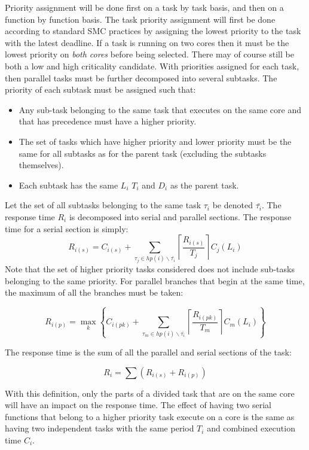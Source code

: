 \documentclass[table,11pt]{article}
\begin{document}
Priority assignment will be done first on a task by task basis, and then on a function by function basis. The task priority assignment will first be done according to standard SMC practices by assigning the lowest priority to the task with the latest deadline. If a task is running on two cores then it must be the lowest priority on \emph{both cores} before being selected. There may of course still be both a low and high criticality candidate. With priorities assigned for each task, then parallel tasks must be further decomposed into several subtasks. The priority of each subtask must be assigned such that:
\begin{itemize}
 \item Any sub-task belonging to the same task that executes on the same core and that has precedence must have a higher priority.
 \item The set of tasks which have higher priority and lower priority must be the same for all subtasks as for the parent task (excluding the subtasks themselves).
 \item Each subtask has the same $L_i$ $T_i$ and $D_i$ as the parent task.
\end{itemize}

Let the set of all subtasks belonging to the same task $\tau_i$ be denoted $\bar{\tau_i}$. The response time $R_i$ is decomposed into serial and parallel sections. The response time for a serial section is simply:
\begin{equation}
R_{i(s)} = C_{i(s)} + \sum_{\tau_j \in hp(i)\backslash \bar{\tau_i} } \left\lceil\frac{R_{i(s)}}{T_j} \right\rceil C_j(L_i)
\end{equation}
Note that the set of higher priority tasks considered does not include sub-tasks belonging to the same priority. 
For parallel branches that begin at the same time, the maximum of all the branches must be taken:

\begin{equation}
R_{i(p)} = \max\limits_{k}\left\{ 
C_{i(pk)} + \sum_{\tau_m \in hp(i)\backslash \bar{\tau_i} } \left\lceil\frac{R_{i(pk)}}{T_m} \right\rceil C_m(L_i)
\right\}
\end{equation}

The response time is the sum of all the parallel and serial sections of the task:

\begin{equation}
R_i = \sum(R_{i(s)} + R_{i(p)})
\end{equation}

With this definition, only the parts of a divided task that are on the same core will have an impact on the response time. The effect of having two serial functions that belong to a higher priority task execute on a core is the same as having two independent tasks with the same period $T_i$ and combined execution time $C_i$.
\end{document}
